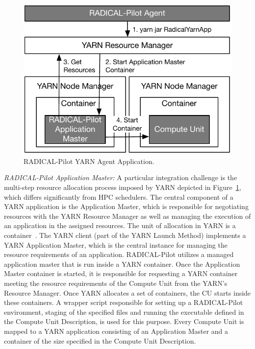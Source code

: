 \begin{figure}[t]
    \centering
    \includegraphics[width=.65\textwidth]{figures/data_analytics_hpc/hpc_hadoop/yarn.pdf}
    \caption{RADICAL-Pilot YARN Agent Application.}
    \label{fig:figures_yarn}
\end{figure}

\emph{RADICAL-Pilot Application Master:}
A particular integration challenge is the multi-step resource allocation process imposed by YARN depicted in Figure~\ref{fig:figures_yarn}, which differs significantly from HPC schedulers.
The central component of a YARN application is the Application Master, which is responsible for negotiating resources with the YARN Resource Manager as well as managing the execution of an application in the assigned resources.
The unit of allocation in YARN is a container~\cite{murthy2014apache}.
The YARN client (part of the YARN Launch Method) implements a YARN Application Master, which is the central instance for managing the resource requirements of an application.
RADICAL-Pilot utilizes a managed application master that is run inside a YARN container.
Once the Application Master container is started, it is responsible for requesting a YARN container meeting the resource requirements of the Compute Unit from the YARN's Resource Manager.
Once YARN allocates a set of containers, the CU starts inside these containers.
A wrapper script responsible for setting up a RADICAL-Pilot environment, staging of the specified files and running the executable defined in the Compute Unit Description, is used for this purpose.
Every Compute Unit is mapped to a YARN application consisting of an Application Master and a container of the size specified in the Compute Unit Description.

